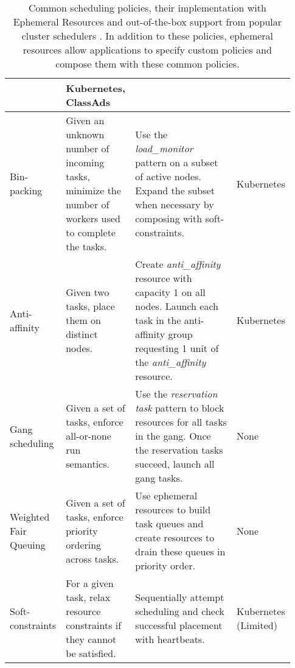 \begin{table*}[t]
\begin{xtabular}{|p{0.12\linewidth}|p{0.24\linewidth}|p{0.45\linewidth}|p{0.12\linewidth}|}
  &
  Kubernetes, ClassAds
  \\
  \hline
  
  Bin-packing & 
  Given an unknown number of incoming tasks, minimize the number of workers used to complete the tasks. &
  Use the \textit{load\_monitor} pattern on a subset of active nodes. Expand the subset when necessary by composing with soft-constraints. &
  Kubernetes
  \\
  \hline
  
  Anti-affinity & 
  Given two tasks, place them on distinct nodes. &
  Create \textit{anti\_affinity} resource with capacity 1 on all nodes. Launch each task in the anti-affinity group requesting 1 unit of the \textit{anti\_affinity} resource.
  &
  Kubernetes
  \\
  \hline
  
  Gang scheduling & 
  Given a set of tasks, enforce all-or-none run semantics. &
  Use the \textit{reservation task} pattern to block resources for all tasks in the gang. Once the reservation tasks succeed, launch all gang tasks. &
  None
  \\
  \hline
  
  Weighted Fair Queuing\cite{wfq} & 
  Given a set of tasks, enforce priority ordering across tasks. &
  Use ephemeral resources to build task queues and create resources to drain these queues in priority order. &
  None
  \\
  \hline
  
  Soft-constraints & 
  For a given task, relax resource constraints if they cannot be satisfied. &
  Sequentially attempt scheduling and check successful placement with heartbeats.   &
  Kubernetes (Limited)
  \\
  \hline
  
  \end{xtabular}
  \caption{Common scheduling policies, their implementation with Ephemeral Resources and out-of-the-box support from popular cluster schedulers . In addition to these policies, ephemeral resources allow applications to specify custom policies and compose them with these common policies.}
  \label{tab:sched-pols}
\end{table*}



